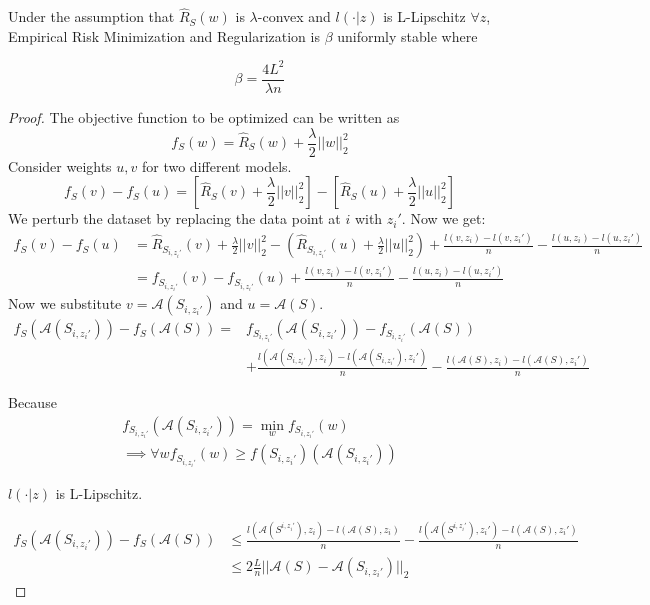 \documentclass{article}
\begin{document}
\begin{thm}
Under the assumption that $\hat{R}_S(w)$ is $\lambda$-convex and $l(\cdot|z)$ is L-Lipschitz $\forall z$, Empirical Risk Minimization and Regularization is $\beta$ uniformly stable where

\[
\beta = \frac{4L^2}{\lambda n}
\]
\end{thm}
\begin{proof}
The objective function to be optimized can be written as
$$f_S(w)=\hat{R}_S(w) + \frac{\lambda}{2}||w||_2^2$$
Consider weights $u,v$ for two different models.
$$f_S(v) - f_S(u) = [\hat{R}_S(v) + \frac{\lambda}{2}||v||_2^2] - [\hat{R}_S(u) + \frac{\lambda}{2}||u||_2^2]$$
We perturb the dataset by replacing the data point at $i$ with $z_i'$. Now we get:
\begin{align*}
    f_S(v) - f_S(u) &= \hat{R}_{S_{i,z_i'}}(v) + \frac{\lambda}{2}||v||_2^2 - (\hat{R}_{S_{i,z_i'}}(u) + \frac{\lambda}{2}||u||^2_2) + \frac{l(v, z_i) - l(v, z_i')}{n} - \frac{l(u, z_i) - l(u,z_i')}{n} \\
    &= f_{S_{i,z_i'}}(v) - f_{S_{i,z_i'}}(u) + \frac{l(v, z_i) - l(v, z_i')}{n} - \frac{l(u, z_i) - l(u,z_i')}{n}
\end{align*}
Now we substitute $v=\mathcal{A}(S_{i,z_i'})$ and $u=\mathcal{A}(S)$.
\begin{align*}
    f_S(\mathcal{A}(S_{i,z_i'})) - f_S(\mathcal{A}(S)) 
    =& f_{S_{i,z_i'}}(\mathcal{A}(S_{i,z_i'})) - f_{S_{i,z_i'}}(\mathcal{A}(S)) \\ &+ \frac{l(\mathcal{A}(S_{i,z_i'}), z_i) - l(\mathcal{A}(S_{i,z_i'}), z_i')}{n} - \frac{l(\mathcal{A}(S), z_i) - l(\mathcal{A}(S),z_i')}{n}
\end{align*}

Because
\begin{align*}
f_{S_{i,z_i'}}(\mathcal{A}(S_{i, z_i'})) = \min_w f_{S_{i,z_i'}}(w) \\
\implies \forall w f_{S_{i,z_i'}}(w) \geq f(S_{i,z_i'})(\mathcal{A}(S_{i, z_i'}))
\end{align*}

\begin{assm}
    $l(\cdot|z)$ is L-Lipschitz.
\end{assm}

\begin{align}
f_S(\mathcal{A}(S_{i,z_i'})) - f_S(\mathcal{A}(S)) &\leq \frac{l(\mathcal{A}(S^{i,z_i'}), z_i) - l(\mathcal{A}(S), z_i)}{n} - \frac{l(\mathcal{A}(S^{i,z_i'}), z_i') - l(\mathcal{A}(S),z_i')}{n} \nonumber\\
&\leq 2\frac{L}{n}||\mathcal{A}(S)-\mathcal{A}(S_{i,z_i'})||_2 \label{eq:one}
\end{align}


\end{proof}
\end{document}
